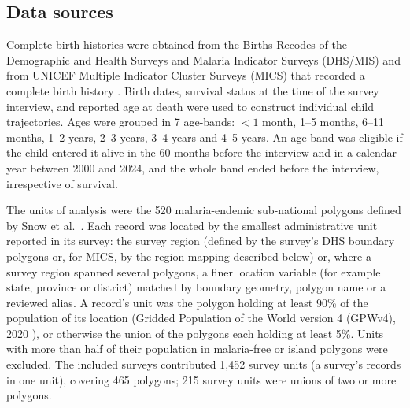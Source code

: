 \subsection*{Data sources}

Complete birth histories were obtained from the Births Recodes of the Demographic and Health Surveys and Malaria Indicator Surveys (DHS/MIS) \cite{dhs} and from UNICEF Multiple Indicator Cluster Surveys (MICS) that recorded a complete birth history \cite{mics}. Birth dates, survival status at the time of the survey interview, and reported age at death were used to construct individual child trajectories. Ages were grouped in 7 age-bands: $<1$ month, 1--5 months, 6--11 months, 1--2 years, 2--3 years, 3--4 years and 4--5 years. An age band was eligible if the child entered it alive in the 60 months before the interview and in a calendar year between 2000 and 2024, and the whole band ended before the interview, irrespective of survival.

The units of analysis were the 520 malaria-endemic sub-national polygons defined by Snow et al.\ \cite{snow:17}. Each record was located by the smallest administrative unit reported in its survey: the survey region (defined by the survey's DHS boundary polygons or, for MICS, by the region mapping described below) or, where a survey region spanned several polygons, a finer location variable (for example state, province or district) matched by boundary geometry, polygon name or a reviewed alias. A record's unit was the polygon holding at least 90\% of the population of its location (Gridded Population of the World version 4 (GPWv4), 2020 \cite{gpwv4}), or otherwise the union of the polygons each holding at least 5\%. Units with more than half of their population in malaria-free or island polygons were excluded. The included surveys contributed 1,452 survey units (a survey's records in one unit), covering 465 polygons; 215 survey units were unions of two or more polygons.

